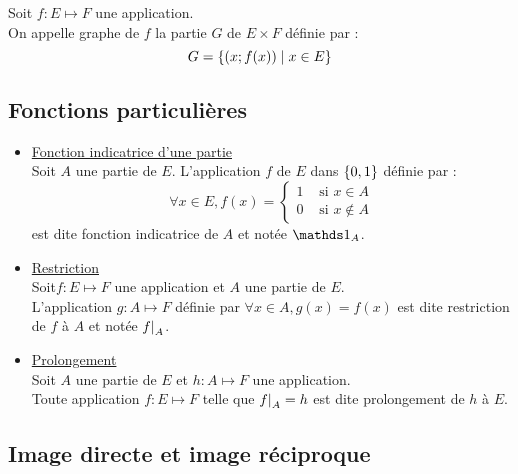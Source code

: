 \begin{defprop}  [Graphe]
Soit \(f : E \mapsto F\) une application. \\
On appelle graphe de \(f\) la partie \(G\) de \(E \times F\) définie par :
\[ G = \left\lbrace\left(x; f (x)\right)\;\middle|\; x \in E\right\rbrace \]
\end{defprop}

\subsection{Fonctions particulières}
\begin{defprop}
    \begin{itemize}
        \item  \underline{Fonction indicatrice d’une partie} \\
        Soit \(A\) une partie de \(E\). L’application \(f\) de \(E\) dans \(\left\lbrace0, 1\right\rbrace\) définie par :
        \[\forall x \in E, f(x) = \begin{cases}
            1 &\text{ si } x\in A \\
            0 &\text{ si } x\notin A
        \end{cases}\]
        est dite fonction indicatrice de \(A\) et notée \(\ind{A}\).
        \item \underline{Restriction} \\
        Soit\( f : E \mapsto F\) une application et \(A\) une partie de \(E\). \\
        L’application \(g : A \mapsto F\) définie par \( \forall x \in A, g(x) = f (x)\) est dite restriction de \(f\) à \(A\) et notée \(\restr{f}{A}\).
        \item \underline{Prolongement} \\
        Soit \(A\) une partie de \(E\) et \(h : A \mapsto F\) une application. \\
        Toute application \(f : E \mapsto F \) telle que \(\restr{f}{A} = h\) est dite prolongement de \(h\) à \(E\).
    \end{itemize}
\end{defprop}

\subsection{Image directe et image réciproque}

